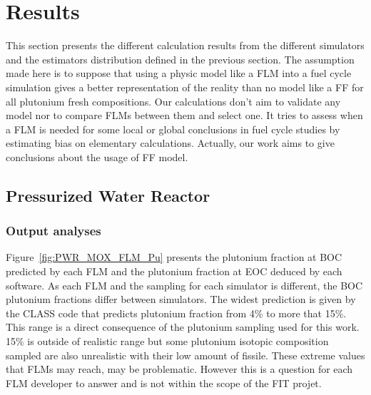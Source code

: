 
\section{Results}
\label{sec:results}
This section presents the different calculation results from the different simulators and the estimators distribution defined in the previous section.
The assumption made here is to suppose that using a physic model like a \gls{FLM} into a fuel cycle simulation gives a better representation of the reality than no model like a \gls{FF} for all plutonium fresh compositions.
Our calculations don't aim to validate any model nor to compare \gls{FLM}s between them and select one.
It tries to assess when a \gls{FLM} is needed for some local or global conclusions in fuel cycle studies by estimating bias on elementary calculations.
Actually, our work aims to give conclusions about the usage of \gls{FF} model.
  

\subsection{Pressurized Water Reactor}
\subsubsection{Output analyses}

Figure~\ref{fig:PWR_MOX_FLM_Pu} presents the plutonium fraction at \gls{BOC} predicted by each \gls{FLM} and the plutonium fraction at \gls{EOC} deduced by each software.
As each FLM and the sampling for each simulator is different, the \gls{BOC} plutonium fractions differ between simulators.
The widest prediction is given by the CLASS code that predicts plutonium fraction from 4\% to more that 15\%.
This range is a direct consequence of the plutonium sampling used for this work.
15\% is outside of realistic range but some plutonium isotopic composition sampled are also unrealistic with their low amount of fissile. These extreme values that \gls{FLM}s may reach, may be problematic. However this is a question for each \gls{FLM} developer to answer and is not within the scope of the FIT projet.

